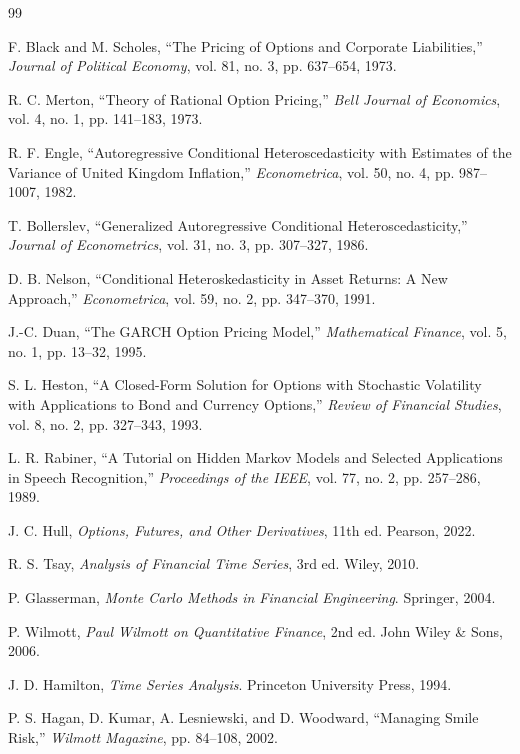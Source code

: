 \documentclass[journal]{IEEEtran}
\begin{document}
\begin{thebibliography}{99}

F. Black and M. Scholes, ``The Pricing of Options and Corporate Liabilities,'' \emph{Journal of Political Economy}, vol. 81, no. 3, pp. 637--654, 1973.

R. C. Merton, ``Theory of Rational Option Pricing,'' \emph{Bell Journal of Economics}, vol. 4, no. 1, pp. 141--183, 1973.

R. F. Engle, ``Autoregressive Conditional Heteroscedasticity with Estimates of the Variance of United Kingdom Inflation,'' \emph{Econometrica}, vol. 50, no. 4, pp. 987--1007, 1982.

T. Bollerslev, ``Generalized Autoregressive Conditional Heteroscedasticity,'' \emph{Journal of Econometrics}, vol. 31, no. 3, pp. 307--327, 1986.

D. B. Nelson, ``Conditional Heteroskedasticity in Asset Returns: A New Approach,'' \emph{Econometrica}, vol. 59, no. 2, pp. 347--370, 1991.

J.-C. Duan, ``The GARCH Option Pricing Model,'' \emph{Mathematical Finance}, vol. 5, no. 1, pp. 13--32, 1995.

S. L. Heston, ``A Closed-Form Solution for Options with Stochastic Volatility with Applications to Bond and Currency Options,'' \emph{Review of Financial Studies}, vol. 8, no. 2, pp. 327--343, 1993.

L. R. Rabiner, ``A Tutorial on Hidden Markov Models and Selected Applications in Speech Recognition,'' \emph{Proceedings of the IEEE}, vol. 77, no. 2, pp. 257--286, 1989.

J. C. Hull, \emph{Options, Futures, and Other Derivatives}, 11th ed. Pearson, 2022.

R. S. Tsay, \emph{Analysis of Financial Time Series}, 3rd ed. Wiley, 2010.

P. Glasserman, \emph{Monte Carlo Methods in Financial Engineering}. Springer, 2004.

P. Wilmott, \emph{Paul Wilmott on Quantitative Finance}, 2nd ed. John Wiley \& Sons, 2006.

J. D. Hamilton, \emph{Time Series Analysis}. Princeton University Press, 1994.

P. S. Hagan, D. Kumar, A. Lesniewski, and D. Woodward, ``Managing Smile Risk,'' \emph{Wilmott Magazine}, pp. 84--108, 2002.


\end{thebibliography}
\end{document}
